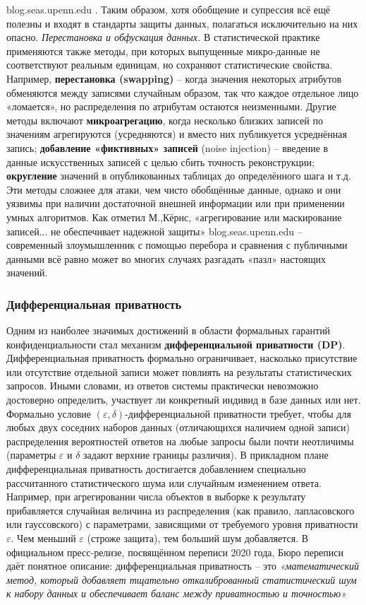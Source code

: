blog.seas.upenn.edu
. Таким образом, хотя обобщение и супрессия всё ещё полезны и входят в стандарты защиты данных, полагаться исключительно на них опасно. \textit{Перестановка и обфускация данных.} В статистической практике применяются также методы, при которых выпущенные микро-данные не соответствуют реальным единицам, но сохраняют статистические свойства. Например, \textbf{перестановка (swapping)} – когда значения некоторых атрибутов обменяются между записями случайным образом, так что каждое отдельное лицо «ломается», но распределения по атрибутам остаются неизменными. Другие методы включают \textbf{микроагрегацию}, когда несколько близких записей по значениям агрегируются (усредняются) и вместо них публикуется усреднённая запись; \textbf{добавление «фиктивных» записей} (noise injection) – введение в данные искусственных записей с целью сбить точность реконструкции; \textbf{округление} значений в опубликованных таблицах до определённого шага и т.д. Эти методы сложнее для атаки, чем чисто обобщённые данные, однако и они уязвимы при наличии достаточной внешней информации или при применении умных алгоритмов. Как отметил М.,Кёрнс, «агрегирование или маскирование записей... не обеспечивает надежной защиты»
blog.seas.upenn.edu
 – современный злоумышленник с помощью перебора и сравнения с публичными данными всё равно может во многих случаях разгадать «пазл» настоящих значений. \subsubsection{Дифференциальная приватность} \label{sec:dp}
Одним из наиболее значимых достижений в области формальных гарантий конфиденциальности стал механизм \textbf{дифференциальной приватности (DP)}. Дифференциальная приватность формально ограничивает, насколько присутствие или отсутствие отдельной записи может повлиять на результаты статистических запросов. Иными словами, из ответов системы практически невозможно достоверно определить, участвует ли конкретный индивид в базе данных или нет. Формально условие $(\varepsilon,\delta)$-дифференциальной приватности требует, чтобы для любых двух соседних наборов данных (отличающихся наличием одной записи) распределения вероятностей ответов на любые запросы были почти неотличимы (параметры $\varepsilon$ и $\delta$ задают верхние границы различия). В прикладном плане дифференциальная приватность достигается добавлением специально рассчитанного статистического шума или случайным изменением ответа. Например, при агрегировании числа объектов в выборке к результату прибавляется случайная величина из распределения (как правило, лапласовского или гауссовского) с параметрами, зависящими от требуемого уровня приватности $\varepsilon$. Чем меньший $\varepsilon$ (строже защита), тем больший шум добавляется. В официальном пресс-релизе, посвящённом переписи 2020 года, Бюро переписи даёт понятное описание: дифференциальная приватность – это \textit{«математический метод, который добавляет тщательно откалиброванный статистический шум к набору данных и обеспечивает баланс между приватностью и точностью»}
